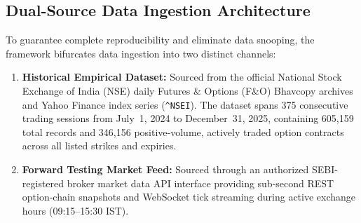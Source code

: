 \documentclass[journal]{IEEEtran}
\begin{document}
\begin{table}[!t]
\renewcommand{\arraystretch}{1.15}
\caption{QuantLens Quantitative Architecture and Computational Pipeline}
\label{tab:pipeline_arch}
\centering
{}
\end{table}

\subsection{Dual-Source Data Ingestion Architecture}
To guarantee complete reproducibility and eliminate data snooping, the framework bifurcates data ingestion into two distinct channels:
\begin{enumerate}
    \item \textbf{Historical Empirical Dataset:} Sourced from the official National Stock Exchange of India (NSE) daily Futures \& Options (F\&O) Bhavcopy archives and Yahoo Finance index series (\texttt{\string^NSEI}). The dataset spans 375 consecutive trading sessions from July~1, 2024 to December~31, 2025, containing 605{,}159 total records and 346{,}156 positive-volume, actively traded option contracts across all listed strikes and expiries.
    \item \textbf{Forward Testing Market Feed:} Sourced through an authorized SEBI-registered broker market data API interface providing sub-second REST option-chain snapshots and WebSocket tick streaming during active exchange hours (09:15--15:30 IST).
\end{enumerate}
\end{document}
